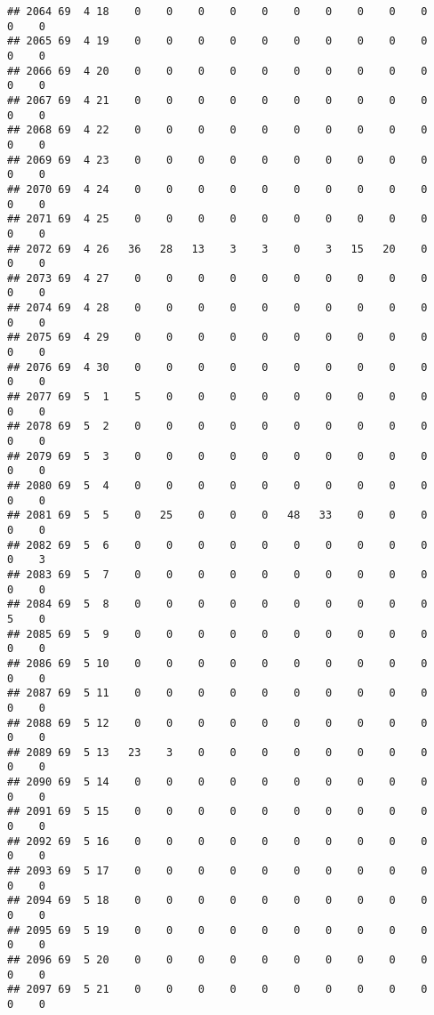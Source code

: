 \documentclass[]{article}
\begin{document}
\begin{verbatim}
## 2064 69  4 18    0    0    0    0    0    0    0    0    0    0    0    0
## 2065 69  4 19    0    0    0    0    0    0    0    0    0    0    0    0
## 2066 69  4 20    0    0    0    0    0    0    0    0    0    0    0    0
## 2067 69  4 21    0    0    0    0    0    0    0    0    0    0    0    0
## 2068 69  4 22    0    0    0    0    0    0    0    0    0    0    0    0
## 2069 69  4 23    0    0    0    0    0    0    0    0    0    0    0    0
## 2070 69  4 24    0    0    0    0    0    0    0    0    0    0    0    0
## 2071 69  4 25    0    0    0    0    0    0    0    0    0    0    0    0
## 2072 69  4 26   36   28   13    3    3    0    3   15   20    0    0    0
## 2073 69  4 27    0    0    0    0    0    0    0    0    0    0    0    0
## 2074 69  4 28    0    0    0    0    0    0    0    0    0    0    0    0
## 2075 69  4 29    0    0    0    0    0    0    0    0    0    0    0    0
## 2076 69  4 30    0    0    0    0    0    0    0    0    0    0    0    0
## 2077 69  5  1    5    0    0    0    0    0    0    0    0    0    0    0
## 2078 69  5  2    0    0    0    0    0    0    0    0    0    0    0    0
## 2079 69  5  3    0    0    0    0    0    0    0    0    0    0    0    0
## 2080 69  5  4    0    0    0    0    0    0    0    0    0    0    0    0
## 2081 69  5  5    0   25    0    0    0   48   33    0    0    0    0    0
## 2082 69  5  6    0    0    0    0    0    0    0    0    0    0    0    3
## 2083 69  5  7    0    0    0    0    0    0    0    0    0    0    0    0
## 2084 69  5  8    0    0    0    0    0    0    0    0    0    0    5    0
## 2085 69  5  9    0    0    0    0    0    0    0    0    0    0    0    0
## 2086 69  5 10    0    0    0    0    0    0    0    0    0    0    0    0
## 2087 69  5 11    0    0    0    0    0    0    0    0    0    0    0    0
## 2088 69  5 12    0    0    0    0    0    0    0    0    0    0    0    0
## 2089 69  5 13   23    3    0    0    0    0    0    0    0    0    0    0
## 2090 69  5 14    0    0    0    0    0    0    0    0    0    0    0    0
## 2091 69  5 15    0    0    0    0    0    0    0    0    0    0    0    0
## 2092 69  5 16    0    0    0    0    0    0    0    0    0    0    0    0
## 2093 69  5 17    0    0    0    0    0    0    0    0    0    0    0    0
## 2094 69  5 18    0    0    0    0    0    0    0    0    0    0    0    0
## 2095 69  5 19    0    0    0    0    0    0    0    0    0    0    0    0
## 2096 69  5 20    0    0    0    0    0    0    0    0    0    0    0    0
## 2097 69  5 21    0    0    0    0    0    0    0    0    0    0    0    0

\end{verbatim}
\end{document}
